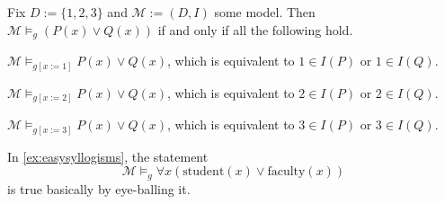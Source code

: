 \begin{example}
	Fix $D:=\{1,2,3\}$ and $\mathcal M:=(D,I)$ some model. Then $\mathcal M\models_g(P(x)\lor Q(x))$ if and only if all the following hold.
	\begin{listroman}
		\item $\mathcal M\models_{g[x:=1]}P(x)\lor Q(x)$, which is equivalent to $1\in I(P)$ or $1\in I(Q)$.
		\item $\mathcal M\models_{g[x:=2]}P(x)\lor Q(x)$, which is equivalent to $2\in I(P)$ or $2\in I(Q)$.
		\item $\mathcal M\models_{g[x:=3]}P(x)\lor Q(x)$, which is equivalent to $3\in I(P)$ or $3\in I(Q)$.
	\end{listroman}
\end{example}
\begin{example}
	In \autoref{ex:easysyllogisms}, the statement
	\[\mathcal M\models_g\forall x(\mathrm{student}(x)\lor\mathrm{faculty}(x))\]
	is true basically by eye-balling it.
\end{example}